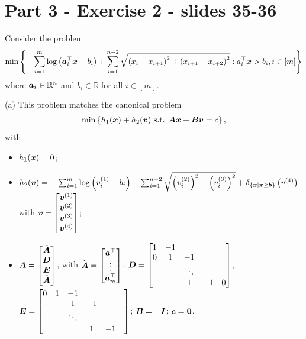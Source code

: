 \section{Part 3 - Exercise 2 - slides 35-36}
Consider the problem
\begin{align*}
	\min \left\{-\sum_{i=1}^m\log\left(\boldsymbol a_i^\top \boldsymbol x - b_i\right)+ \sum_{i=1}^{n-2} \sqrt{\left(x_i-x_{i+1}\right)^2+\left(x_{i+1}-x_{i+2}\right)^2}: a_i^\top \boldsymbol x > b_i, i\in [m] \right\}
\end{align*}
where $\boldsymbol a_i \in \mathbb{R}^n$ and $b_i \in \mathbb{R}$ for all $i\in [m]$. 

\indent (a) This problem matches the canonical problem 
\begin{align*}
	\min \left\{h_1(\boldsymbol x) + h_2(\boldsymbol v) \text{ s.t. }  \boldsymbol{Ax}+ \boldsymbol{Bv} = c \right\},
\end{align*}
with
\begin{itemize}
	\item $h_1(\boldsymbol x)=0$;
	\item $h_2(\boldsymbol v) = -\sum_{i=1}^m\log\left( v_i^{(1)} - b_i\right)+ \sum_{i=1}^{n-2} \sqrt{\left(v_i^{(2)}\right)^2+\left(v_i^{(3)}\right)^2}+ \delta_{\left\{\boldsymbol x|\boldsymbol x \geq \boldsymbol b\right\}}\left(v^{(4)}\right)$ with $\boldsymbol v = \begin{bmatrix}
		\boldsymbol v^{(1)} \\ \boldsymbol v^{(2)} \\ \boldsymbol v^{(3)} \\ \boldsymbol v^{(4)}
	\end{bmatrix}$;
	\item $\boldsymbol A = \begin{bmatrix}
		\Tilde{\boldsymbol  A} \\ \boldsymbol D \\ \boldsymbol E \\  \Tilde{\boldsymbol A} 
	\end{bmatrix}$, with $\Tilde{\boldsymbol A} = \begin{bmatrix}
		\boldsymbol a_1^\top \\ \vdots \\ \boldsymbol a_m^\top
	\end{bmatrix}$, $\boldsymbol D = \begin{bmatrix}
		1 & -1 &&& \\ 0 &1 &-1 && \\ && \ddots && \\ &&1&-1&0
	\end{bmatrix}$, $\boldsymbol E = \begin{bmatrix}
		0 &1 & -1 && \\ & &1 &-1 && \\ && \ddots && \\ &&&1&-1
	\end{bmatrix}$; $\boldsymbol B = -\boldsymbol I$; $\boldsymbol c = \boldsymbol 0$. 
\end{itemize}
